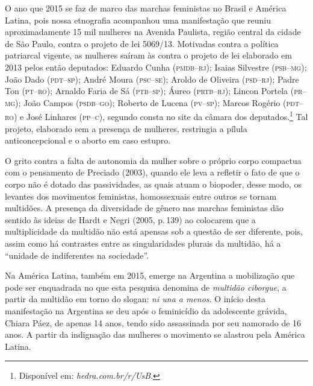 O ano que 2015 se faz de marco das marchas feministas no Brasil e
América Latina, pois nossa etnografia acompanhou uma manifestação que
reuniu aproximadamente 15 mil mulheres na Avenida Paulista, região
central da cidade de São Paulo, contra o projeto de lei 5069/13.
Motivadas contra a política patriarcal vigente, as mulheres saíram às
contra o projeto de lei elaborado em 2013 pelos então deputados:
Eduardo Cunha (\textsc{pmdb}--\textsc{rj}); 
Isaias Silvestre (\textsc{psb}--\textsc{mg});
João Dado (\textsc{pdt}--\textsc{sp});
André Moura (\textsc{psc}--\textsc{se});
Aroldo de Oliveira (\textsc{psd}--\textsc{rj});
Padre Ton (\textsc{pt}--\textsc{ro});
Arnaldo Faria de Sá (\textsc{ptb}--\textsc{sp}); 
Áureo (\textsc{prtb}--\textsc{rj}); 
Lincon Portela (\textsc{pr}--\textsc{mg});
João Campos (\textsc{psdb}--\textsc{go}); 
Roberto de Lucena (\textsc{pv}--\textsc{sp}); 
Marcos Rogério (\textsc{pdt}--\textsc{ro}) e José Linhares (\textsc{pp}--\textsc{c}), segundo consta no site da câmara dos
deputados.\footnote{Disponível em:
  \textit{hedra.com.br/r/UsB}.} Tal projeto, elaborado sem a presença de
mulheres, restringia a pílula anticoncepcional e o aborto em caso
estupro.

O grito contra a falta de autonomia da mulher sobre o próprio corpo
compactua com o pensamento de Preciado (2003), quando ele leva a
refletir o fato de que o corpo não é dotado das passividades, as quais
atuam o biopoder, desse modo, os levantes dos movimentos feministas,
homossexuais entre outros se tornam multidões. A presença da diversidade
de gênero nas marchas feministas dão sentido às ideias de Hardt e Negri
(2005, p.\,139) ao colocarem que a multiplicidade da multidão não está
apensas sob a questão de ser diferente, pois, assim como há contrastes
entre as singularidades plurais da multidão, há a ``unidade de
indiferentes na sociedade''.

Na América Latina, também em 2015, emerge na Argentina a mobilização que
pode ser enquadrada no que esta pesquisa denomina de \textit{multidão ciborgue},
a partir da multidão em torno do slogan: \textit{ni una a menos}. O início desta
manifestação na Argentina se deu após o feminicídio da adolescente
grávida, Chiara Páez, de apenas 14 anos, tendo sido assassinada por seu
namorado de 16 anos. A partir da indignação das mulheres o movimento se
alastrou pela América Latina.

